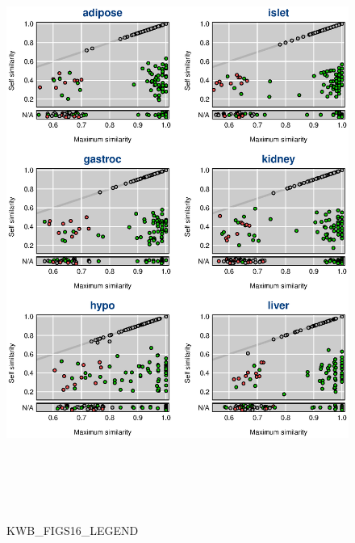 \documentclass[letterpaper,twoside]{article}
\begin{document}
\begin{figure}[p]
\centerline{\includegraphics[height=7.65in]{SuppFigs/figS16.eps}}

\caption{KWB_FIGS16_LEGEND}
\end{figure}


\clearpage
\end{document}
